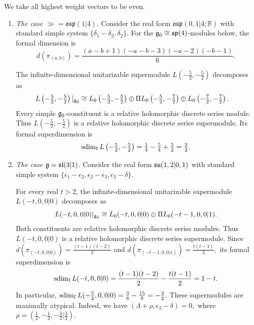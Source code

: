 \begin{example}
We take all highest weight vectors to be even.

\begin{enumerate}
\item[(a)] \emph{The case $\gg=\mathfrak{osp}(1\vert4)$.}
Consider the real form $\mathfrak{osp}(0,1\vert4;\mathbb R)$ with standard simple system $\{\delta_1-\delta_2,\delta_2\}$.  For the $\even\cong\mathfrak{sp}(4)$-modules below, the formal dimension is
\begin{equation*}
d(\pi_{(a,b)})
=
\frac{(a-b+1)(-a-b-3)(-a-2)(-b-1)}{6}.
\end{equation*}

The infinite-dimensional unitarizable supermodule $L(-\frac52,-\frac52)$ decomposes as
\begin{equation*}
\begin{aligned}
L\left(-\tfrac52,-\tfrac52\right)|_{\even}
\cong{}&
L_0\left(-\tfrac52,-\tfrac52\right)
\oplus\Pi L_0\left(-\tfrac52,-\tfrac72\right) \oplus L_0\left(-\tfrac72,-\tfrac72\right).
\end{aligned}
\end{equation*}
Every simple $\even$-constituent is a relative holomorphic discrete series module. Thus $L(-\frac52,-\frac52)$ is a relative holomorphic discrete series supermodule. Its formal superdimension is
\[
\fsdim L\left(-\tfrac52,-\tfrac52\right)
=\tfrac14-\tfrac54+\tfrac52=\tfrac32.
\]

\item[(b)] \emph{The case $\gg=\sl(3\vert1)$.}
Consider the real form $\su(1,2\vert0,1)$ with standard simple system
$\{\epsilon_1-\epsilon_2,\epsilon_2-\epsilon_3,\epsilon_3-\delta\}$. 

For every real $t>2$, the infinite-dimensional unitarizable supermodule $L(-t,0,0\vert0)$ decomposes as
\begin{equation*}
L(-t,0,0\vert0)|_{\even}
\cong
L_0(-t,0,0\vert0)
\oplus\Pi L_0(-t-1,0,0\vert1).
\end{equation*}
Both constituents are relative holomorphic discrete series modules. Thus $L(-t,0,0\vert0)$ is a relative holomorphic discrete series supermodule. Since
$
d(\pi_{(-t,0,0\vert0)})=\frac{(t-1)(t-2)}{2}
$
and
$
d(\pi_{(-t-1,0,0\vert1)})=\frac{t(t-1)}{2},
$
its formal superdimension is
\begin{equation*}
\fsdim L(-t,0,0\vert0)
=
\frac{(t-1)(t-2)}{2}
-
\frac{t(t-1)}{2}
=
1-t.
\end{equation*}
In particular,
$
\fsdim L(-\frac52,0,0\vert0)
=\frac38-\frac{15}{8}=-\frac32.
$ These supermodules are maximally atypical. Indeed, we have
$
(\Lambda+\rho,\epsilon_3-\delta)=0,
$ where $\rho=(\frac12,-\frac12,-\frac32\vert\frac32)$.
\end{enumerate}
\end{example}

